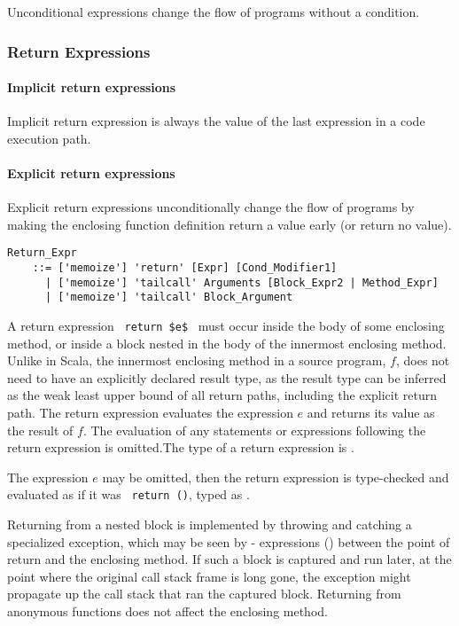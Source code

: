 Unconditional expressions change the flow of programs without a condition. 






\subsubsection{Return Expressions}
\label{sec:return-expressions}

\paragraph{Implicit return expressions}
Implicit return expression is always the value of the last expression in a code execution path. 

\paragraph{Explicit return expressions}
Explicit return expressions unconditionally change the flow of programs by making the enclosing function definition return a value early (or return no value). 

\grammar\begin{lstlisting}
Return_Expr 
    ::= ['memoize'] 'return' [Expr] [Cond_Modifier1]
      | ['memoize'] 'tailcall' Arguments [Block_Expr2 | Method_Expr]
      | ['memoize'] 'tailcall' Block_Argument
\end{lstlisting}

A return expression ~\lstinline!return $e$!~ must occur inside the body of some enclosing method, or inside a block nested in the body of the innermost enclosing method. Unlike in Scala, the innermost enclosing method in a source program, $f$, does not need to have an explicitly declared result type, as the result type can be inferred as the weak least upper bound of all return paths, including the explicit return path. The return expression evaluates the expression $e$ and returns its value as the result of $f$. The evaluation of any statements or expressions following the return expression is omitted.The type of a return expression is .

The expression $e$ may be omitted, then the return expression  is type-checked and evaluated as if it was ~\lstinline!return ()!, typed as . 

Returning from a nested block is implemented by throwing and catching a specialized exception, which may be seen by - expressions () between the point of return and the enclosing method. If such a block is captured and run later, at the point where the original call stack frame is long gone, the exception might propagate up the call stack that ran the captured block. Returning from anonymous functions does not affect the enclosing method. 

